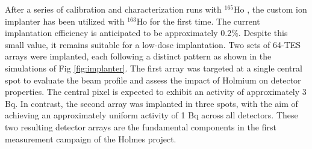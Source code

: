 After a series of calibration and characterization runs with $^{165}$Ho \cite{Hoimplant}, the custom ion implanter has
been utilized with $^{163}$Ho for the first time. The current implantation efficiency is anticipated to be approximately
0.2\%. Despite this small value, it remains suitable for a low-dose implantation.
Two sets of 64-TES arrays were implanted, each following a distinct pattern as shown in the simulations of Fig
\ref{fig:implanter}. The first array was targeted at a single
central spot to evaluate the beam profile and assess the impact of Holmium on detector properties. The central pixel is expected to exhibit an activity of approximately 3 Bq.
In contrast, the second array was implanted in three spots, with the aim of achieving an approximately uniform activity
of 1 Bq across all detectors. These two resulting detector arrays are the fundamental components in the first measurement campaign of the Holmes project.
